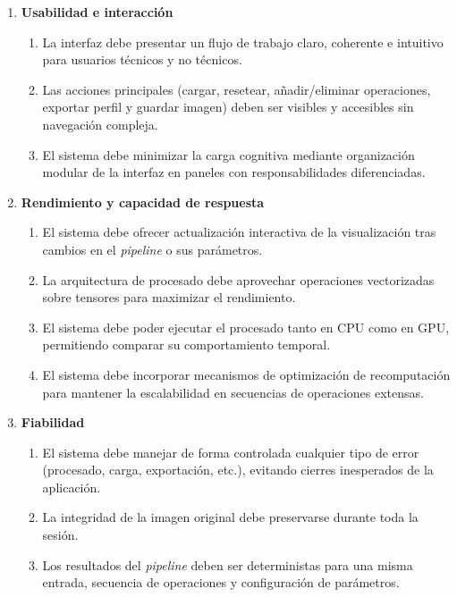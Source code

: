 \begin{enumerate}[leftmargin=15pt]
	\item \textbf{Usabilidad e interacción}\label{req:rnf-1}
	\begin{enumerate}
		\item[1.1.] La interfaz debe presentar un flujo de trabajo claro, coherente e intuitivo para usuarios técnicos y no técnicos.\label{req:rnf-1-1}
		\item[1.2.] Las acciones principales (cargar, resetear, añadir/eliminar operaciones, exportar perfil y guardar imagen) deben ser visibles y accesibles sin navegación compleja.\label{req:rnf-1-2}
		\item[1.3.] El sistema debe minimizar la carga cognitiva mediante organización modular de la interfaz en paneles con responsabilidades diferenciadas.\label{req:rnf-1-3}
	\end{enumerate}

	\vspace{0.5em}

	\item \textbf{Rendimiento y capacidad de respuesta}\label{req:rnf-2}
	\begin{enumerate}
		\item[2.1.] El sistema debe ofrecer actualización interactiva de la visualización tras cambios en el \textit{pipeline} o sus parámetros.\label{req:rnf-2-1}
		\item[2.2.] La arquitectura de procesado debe aprovechar operaciones vectorizadas sobre tensores para maximizar el rendimiento.\label{req:rnf-2-2}
		\item[2.3.] El sistema debe poder ejecutar el procesado tanto en CPU como en GPU, permitiendo comparar su comportamiento temporal.\label{req:rnf-2-3}
		\item[2.4.] El sistema debe incorporar mecanismos de optimización de recomputación para mantener la escalabilidad en secuencias de operaciones extensas.\label{req:rnf-2-4}
	\end{enumerate}

	\vspace{0.5em}

	\item \textbf{Fiabilidad}\label{req:rnf-3}
	\begin{enumerate}
		\item[3.1.] El sistema debe manejar de forma controlada cualquier tipo de error (procesado, carga, exportación, etc.), evitando cierres inesperados de la aplicación.\label{req:rnf-3-1}
		\item[3.2.] La integridad de la imagen original debe preservarse durante toda la sesión.\label{req:rnf-3-2}
		\item[3.3.] Los resultados del \textit{pipeline} deben ser deterministas para una misma entrada, secuencia de operaciones y configuración de parámetros.\label{req:rnf-3-3}
	\end{enumerate}


\end{enumerate}
